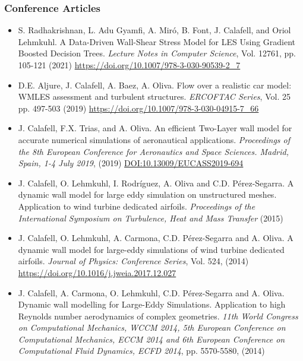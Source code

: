 \documentclass{article}
\begin{document}
\subsubsection{Conference Articles}

\begin{itemize}

\item S. Radhakrishnan, L. Adu Gyamfi, A. Miró, B. Font, J. Calafell, and Oriol Lehmkuhl. A Data-Driven Wall-Shear Stress Model for LES Using Gradient Boosted Decision Trees. {\it Lecture Notes in Computer Science}, Vol. 12761, pp. 105-121 (2021) 
\href{https://doi.org/10.1007/978-3-030-90539-2_7}{https://doi.org/10.1007/978-3-030-90539-2\_7}

\item D.E. Aljure, J. Calafell, A. Baez, A. Oliva. Flow over a realistic car model: WMLES assessment and turbulent structures.  {\it ERCOFTAC Series}, Vol. 25 pp. 497-503 (2019) \href{https://doi.org/10.1007/978-3-030-04915-7_66}{https://doi.org/10.1007/978-3-030-04915-7\_66}

\item J. Calafell, F.X. Trias, and A. Oliva. An efficient Two-Layer wall model for accurate numerical simulations of aeronautical applications. {\it Proceedings of the 8th European Conference for Aeronautics and Space Sciences. Madrid, Spain, 1-4 July 2019}, (2019) \href{DOI:10.13009/EUCASS2019-694}{DOI:10.13009/EUCASS2019-694}

\item J. Calafell, O. Lehmkuhl, I. Rodríguez, A. Oliva  and C.D. Pérez-Segarra. A dynamic wall model for large eddy simulation on unstructured meshes. Application to wind turbine dedicated airfoils. {\it Proceedings of the International Symposium on Turbulence, Heat and Mass Transfer} (2015) 

\item J. Calafell, O. Lehmkuhl, A. Carmona, C.D. Pérez-Segarra and A. Oliva. A dynamic wall model for large-eddy simulations of wind turbine dedicated airfoils. {\it Journal of Physics: Conference Series}, Vol. 524, (2014) \href{https://doi.org/10.1016/j.jweia.2017.12.027}{https://doi.org/10.1016/j.jweia.2017.12.027}

\item J. Calafell, A. Carmona, O. Lehmkuhl, C.D. Pérez-Segarra and A. Oliva. Dynamic wall modelling for Large-Eddy Simulations. Application to high Reynolds number aerodynamics of complex geometries. {\it 11th World Congress on Computational Mechanics, WCCM 2014, 5th European Conference on Computational Mechanics, ECCM 2014 and 6th European Conference on Computational Fluid Dynamics, ECFD 2014}, pp. 5570-5580, (2014) 


\end{itemize}
\end{document}
